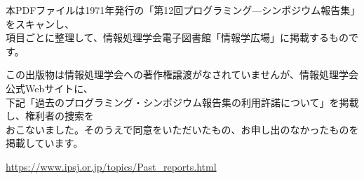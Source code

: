 \documentclass[b5j]{jsarticle}
\begin{document}
\begin{flushleft}

本PDFファイルは1971年発行の「第12回プログラミング—シンポジウム報告集」をスキャンし、\\項目ごとに整理して、情報処理学会電子図書館「情報学広場」に掲載するものです。

\medskip

この出版物は情報処理学会への著作権譲渡がなされていませんが、情報処理学会公式Webサイトに、\\下記「過去のプログラミング・シンポジウム報告集の利用許諾について」を掲載し、権利者の捜索を\\おこないました。そのうえで同意をいただいたもの、お申し出のなかったものを掲載しています。

\medskip

\url{https://www.ipsj.or.jp/topics/Past_reports.html}

\end{flushleft}

\bigskip
\end{document}
